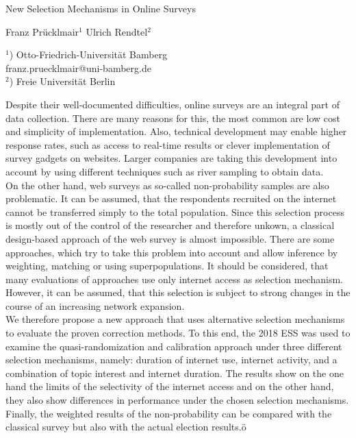 \documentclass[a4paper]{article}
\begin{document}

\Large
 \begin{center}
New Selection Mechanisms in Online Surveys\\ 

\hspace{10pt}

\large
Franz Prücklmair$^1$ Ulrich Rendtel$^2$ \\

\hspace{10pt}

\small  
$^1$) Otto-Friedrich-Universität Bamberg\\
franz.pruecklmair@uni-bamberg.de\\
$^2$) Freie Universität Berlin

\end{center}

\hspace{10pt}

\normalsize

Despite their well-documented difficulties, online surveys are an integral part of data collection. There are many reasons for this, the most common are low cost and simplicity of implementation. Also, technical development may enable higher response rates, such as access to real-time results or clever implementation of survey gadgets on websites. Larger companies are taking this development into account by using different techniques such as river sampling to obtain data.
\\

On the other hand, web surveys as so-called non-probability samples are also problematic. It can be assumed, that the respondents recruited on the internet cannot be transferred simply to the total population. Since this selection process is mostly out of the control of the researcher and therefore unkown, a classical design-based approach of the web survey is almost impossible. There are some approaches, which try to take this problem into account and allow inference by weighting, matching or using superpopulations. It should be considered, that many evaluations of approaches use only internet access as selection mechanism. However, it can be assumed, that this selection is subject to strong changes in the course of an increasing network expansion. 
\\

We therefore propose a new approach that uses alternative selection mechanisms to evaluate the proven correction methods. To this end, the 2018 ESS was used to examine the quasi-randomization and calibration approach under three different selection mechanisms, namely: duration of internet use, internet activity, and a combination of topic interest and internet duration. The results show on the one hand the limits of the selectivity of the internet access and on the other hand, they also show differences in performance under the chosen selection mechanisms.  Finally, the weighted results of the non-probability can be compared with the classical survey but also with the actual election results.ö
\end{document}
